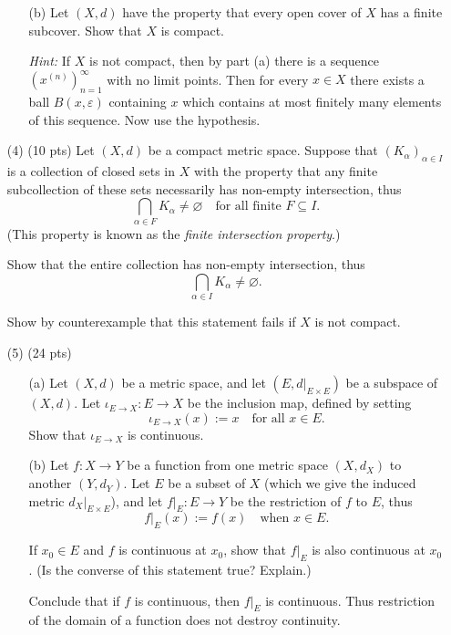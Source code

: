 \documentclass[12pt]{amsart}
\theoremstyle{definition}
\theoremstyle{remark}
\begin{document}
\begin{CJK}{UTF8}{bkai}
\begin{enumerate}
\begin{enumerate}
  
    \item[(b)] 
Let $(X,d)$ have the property that every open cover of $X$ has a finite subcover.  
Show that $X$ is compact.  

\emph{Hint:} If $X$ is not compact, then by part (a) there is a sequence $(x^{(n)})_{n=1}^\infty$ with no limit points.  
Then for every $x \in X$ there exists a ball $B(x,\varepsilon)$ containing $x$ which contains at most finitely many elements of this sequence.  
Now use the hypothesis.
  \end{enumerate}

\vfill
\bigskip

\item[(4)]  (10 pts) Let $(X,d)$ be a compact metric space. Suppose that $(K_\alpha)_{\alpha \in I}$ is a collection of closed sets in $X$ with the property that any finite subcollection of these sets necessarily has non-empty intersection, thus
\[
\bigcap_{\alpha \in F} K_\alpha \neq \varnothing \quad \text{for all finite } F \subseteq I.
\]
(This property is known as the \emph{finite intersection property}.)  

Show that the entire collection has non-empty intersection, thus
\[
\bigcap_{\alpha \in I} K_\alpha \neq \varnothing.
\]

Show by counterexample that this statement fails if $X$ is not compact.
 
\vfill
\bigskip

\item[(5)] (24 pts)
 \begin{enumerate}

  \item[(a)] 
Let $(X,d)$ be a metric space, and let $(E,d|_{E \times E})$ be a subspace of $(X,d)$.  
Let $\iota_{E \to X} : E \to X$ be the inclusion map, defined by setting 
\[
\iota_{E \to X}(x) := x \quad \text{for all } x \in E.
\]  
Show that $\iota_{E \to X}$ is continuous.

 \item[(b)] Let $f : X \to Y$ be a function from one metric space $(X,d_X)$ to another $(Y,d_Y)$.  
Let $E$ be a subset of $X$ (which we give the induced metric $d_X|_{E \times E}$), and let $f|_E : E \to Y$ be the restriction of $f$ to $E$, thus
\[
f|_E(x) := f(x) \quad \text{when } x \in E.
\]  

If $x_0 \in E$ and $f$ is continuous at $x_0$, show that $f|_E$ is also continuous at $x_0$.  
(Is the converse of this statement true? Explain.)  

Conclude that if $f$ is continuous, then $f|_E$ is continuous.  
Thus restriction of the domain of a function does not destroy continuity.  


\end{enumerate}
\end{enumerate}
\end{CJK}
\end{document}
